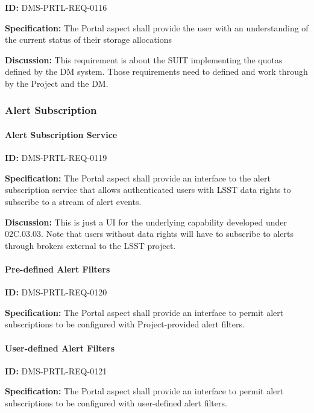\documentclass[SE,toc,lsstdraft]{lsstdoc}
\begin{document}
\label{DMS-PRTL-REQ-0116}
\textbf{ID:} DMS-PRTL-REQ-0116

\textbf{Specification:}
The Portal aspect shall provide the user with an understanding of the current status of their storage allocations

\textbf{Discussion:}
This requirement is about the SUIT implementing the quotas defined by the DM system.  Those requirements need to defined and work through by the Project and the DM.

\subsubsection{Alert Subscription}

\paragraph{Alert Subscription Service}\hfill  %

\label{DMS-PRTL-REQ-0119}
\textbf{ID:} DMS-PRTL-REQ-0119

\textbf{Specification:}
The Portal aspect shall provide an interface to the alert subscription service that allows authenticated users with LSST data rights to subscribe to a stream of alert events.

\textbf{Discussion:}
This is just a UI for the underlying capability developed under 02C.03.03.
Note that users without data rights will have to subscribe to alerts through brokers external to the LSST project.

\paragraph{Pre-defined Alert Filters}\hfill  %

\label{DMS-PRTL-REQ-0120}
\textbf{ID:} DMS-PRTL-REQ-0120

\textbf{Specification:}
The Portal aspect shall provide an interface to permit alert subscriptions to be configured with Project-provided alert filters.

\paragraph{User-defined Alert Filters}\hfill  %

\label{DMS-PRTL-REQ-0121}
\textbf{ID:} DMS-PRTL-REQ-0121

\textbf{Specification:}
The Portal aspect shall provide an interface to permit alert subscriptions to be configured with user-defined alert filters.
\end{document}
